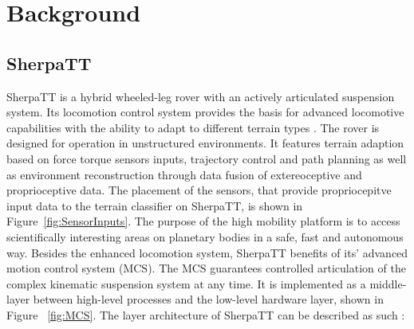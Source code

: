 \documentclass{article}
\begin{document}

\section{Background}


\subsection{SherpaTT}

SherpaTT is a hybrid wheeled-leg rover with an actively articulated suspension system. Its locomotion control system provides the basis for advanced locomotive capabilities with the ability to adapt to different terrain types \cite{cordes2018}. The rover is designed for operation in unstructured environments. It features terrain adaption based on force torque sensors inputs, trajectory control and path planning as well as environment reconstruction through data fusion of extereoceptive and proprioceptive data. The placement of the sensors, that provide propriocepitve input data to the terrain classifier on SherpaTT, is shown in Figure~\ref{fig:SensorInputs}. The purpose of the high mobility platform is to access scientifically interesting areas on planetary bodies in a safe, fast and autonomous way. Besides the enhanced locomotion system, SherpaTT benefits of its’ advanced motion control system (MCS). The MCS guarantees controlled articulation of the complex kinematic suspension system at any time. It is implemented as a middle-layer between high-level processes and the low-level hardware layer, shown in Figure ~\ref{fig:MCS}. The layer architecture of SherpaTT can be described as such \cite{cordes2018}:
\end{document}
